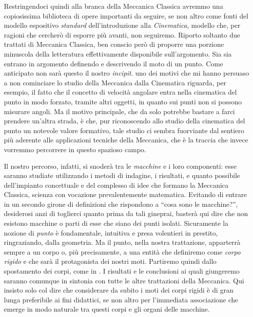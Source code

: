 \noindent Restringendoci quindi alla branca della Meccanica Classica avremmo una copiosissima
biblioteca di opere importanti da seguire, se non altro come fonti del
modello espositivo {\em standard} dell'introduzione alla {\em Cinematica},
modello che, per ragioni che cercher\`o di esporre
pi\`u avanti, non seguiremo.
\noindent Riporto soltanto due trattati di Meccanica Classica, 
ben conscio per\`o di proporre
una  porzione minuscola della letteratura effettivamente disponibile sull'argomento. 
Sia \cite{goldstein} sia \cite{levicivita} entrano in argomento definendo e descrivendo il
moto di un punto. Come anticipato non sar\`a questo il nostro {\em incipit}. uno 
dei motivi che mi hanno persuaso a non cominciare lo studio della Meccanica
dalla Cinematica riguarda, per esempio, il fatto
che il concetto di velocit\`a angolare entra nella cinematica del punto in
modo forzato, tramite
altri oggetti, in quanto sui punti non si possono misurare angoli. Ma il motivo 
principale, che da solo potrebbe bastare a farci prendere un'altra strada, \`e che,
pur riconoscendo allo studio della cinematica del punto un notevole valore
formativo, tale studio ci sembra fuorviante dal sentiero pi\`u aderente alle applicazioni
tecniche della Meccanica, che \`e la traccia che invece
vorremmo percorrere in questo spazioso campo.

\noindent Il nostro percorso, infatti, si snoder\`a tra le {\em macchine} e i loro componenti: esse saranno studiate
utilizzando i metodi di indagine, i risultati, e quanto possibile dell'impianto
concettuale e del complesso di idee che formano la Meccanica Classica,
scienza con vocazione prevalentemente matematica. Evitando
di entrare in un secondo girone di definizioni che rispondono a ``cosa sono le macchine?'',
desiderosi anzi di toglierci quanto prima da tali gineprai,
baster\`a qui dire che non esistono macchine o parti di esse che siano dei punti isolati.
Sicuramente la nozione di {\em punto} \`e fondamentale, intuitiva e presa volentieri
in prestito, ringraziando, dalla geometria. Ma il punto, nella nostra trattazione,
apparterr\`a sempre a un corpo o, pi\`u precisamente, a una entit\`a
che definiremo come {\em corpo rigido}
 e che sar\`a il protagonista dei nostri moti. Partiremo quindi
dallo spostamento dei corpi, come in \cite{whittaker}. I risultati e le conclusioni
ai quali giungeremo saranno comunque in sintonia
con tutte le altre trattazioni della Meccanica. Qui insisto solo col dire che
considerare da subito i moti dei corpi rigidi \`e di gran
lunga preferibile ai fini didattici, se non altro per l'immediata associazione
che emerge in modo naturale tra questi corpi e gli organi delle macchine.


